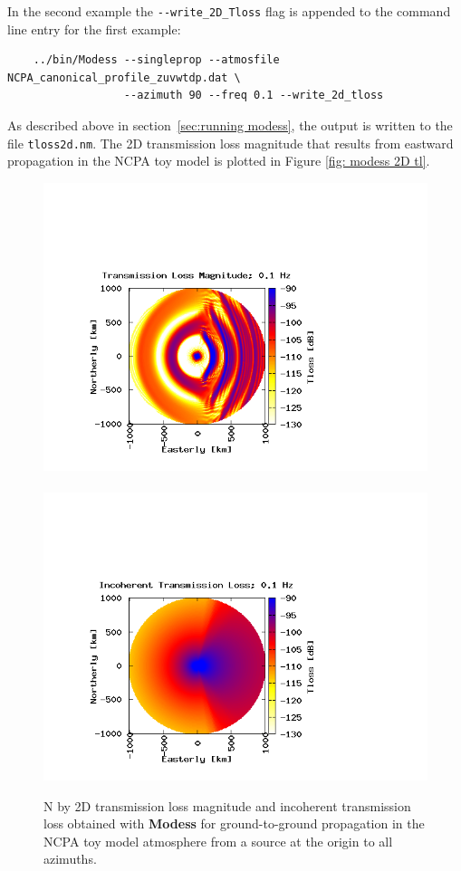 In the second example the \verb+--write_2D_Tloss+ flag is appended to the command line entry for the first example: 
\begin{verbatim} 
    ../bin/Modess --singleprop --atmosfile NCPA_canonical_profile_zuvwtdp.dat \ 
                  --azimuth 90 --freq 0.1 --write_2d_tloss
\end{verbatim}
As described above in section~\ref{sec:running modess}, the output is written to the file \verb+tloss2d.nm+. The 2D transmission loss magnitude that results from eastward propagation in the NCPA toy model is plotted in Figure \ref{fig: modess 2D tl}. 
\begin{figure}
\begin{center}
\includegraphics[scale=0.45,trim = 70 20 180 140,clip]{figs/modess_ex3}\ 
\includegraphics[scale=0.45,trim = 70 20 180 140,clip]{figs/modess_ex3_inco}
\end{center}
\caption{N by 2D transmission loss magnitude and incoherent transmission loss obtained with {\bf Modess} for ground-to-ground propagation in the NCPA toy model atmosphere from a source at the origin to all azimuths.}
\label{fig: modess Nby2D tl}
\end{figure}

